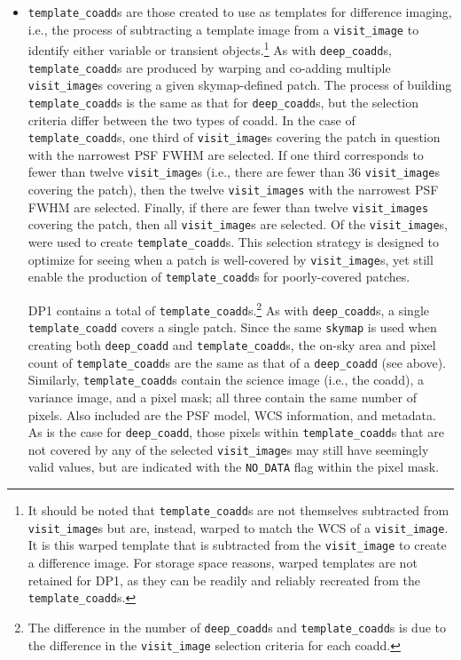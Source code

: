 \begin{itemize}
\item \texttt{template\_coadd}s \citep{10.71929/rubin/2570314} are those created to use as templates for difference imaging, i.e., the process of subtracting a template image from a \texttt{visit\_image} to identify either variable or \gls{transient} objects.\footnote{It should be noted that \texttt{template\_coadd}s are not themselves subtracted from \texttt{visit\_image}s but are, instead, warped to match the \gls{WCS} of a \texttt{visit\_image}.
It is this warped template that is subtracted from the \texttt{visit\_image} to create a difference image.
For storage space reasons, warped templates are not retained for \gls{DP1}, as they can be readily and reliably recreated from the \texttt{template\_coadd}s.}
As with \texttt{deep\_coadd}s, \texttt{template\_coadd}s are produced by warping and co-adding multiple \texttt{visit\_image}s covering a given skymap-defined \gls{patch}.
The process of building \texttt{template\_coadd}s is the same as that for \texttt{deep\_coadd}s, but the selection criteria differ between the two types of coadd.
In the case of \texttt{template\_coadd}s, one third of \texttt{visit\_image}s covering the \gls{patch} in question with the narrowest \gls{PSF} \gls{FWHM} are selected.
If one third corresponds to fewer than twelve \texttt{visit\_image}s (i.e., there are fewer than 36 \texttt{visit\_image}s covering the \gls{patch}), then the twelve \texttt{visit\_images} with the narrowest \gls{PSF} \gls{FWHM} are selected.
Finally, if there are fewer than twelve \texttt{visit\_images} covering the \gls{patch}, then all \texttt{visit\_image}s are selected. 
Of the \nvisitimages \texttt{visit\_image}s, \ntemplatecoaddvisitimages were used to create \texttt{template\_coadd}s.
This selection strategy is designed to optimize for \gls{seeing} when a \gls{patch} is well-covered by \texttt{visit\_image}s, yet still enable the production of \texttt{template\_coadd}s for poorly-covered patches.


DP1 contains a total of \ntemplatecoadds \texttt{template\_coadd}s.\footnote{The difference in the number of \texttt{deep\_coadd}s and \texttt{template\_coadd}s is due to the difference in the \texttt{visit\_image} selection criteria for each coadd.}
As with \texttt{deep\_coadd}s, a single \texttt{template\_coadd} covers a single \gls{patch}.
Since the same \texttt{skymap} is used when creating both \texttt{deep\_coadd} and \texttt{template\_coadd}s, the on-sky area and pixel count of \texttt{template\_coadd}s are the same as that of a \texttt{deep\_coadd} (see above).
Similarly, \texttt{template\_coadd}s contain the science image (i.e., the coadd), a variance image, and a pixel mask; all three contain the same number of pixels.
Also included are the \gls{PSF} model, \gls{WCS} information, and \gls{metadata}.
As is the case for \texttt{deep\_coadd}, those pixels within \texttt{template\_coadd}s that are not covered by any of the selected \texttt{visit\_image}s may still have seemingly valid values, but are indicated with the \texttt{NO\_DATA} flag within the pixel mask.


\end{itemize}
